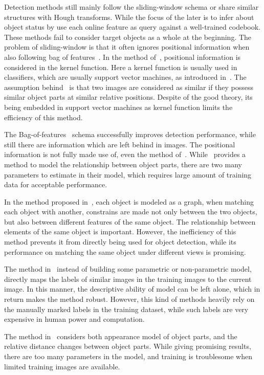 \documentclass[paper]{ieice}
\begin{document}
Detection methods still mainly follow the sliding-window schema or share similar structures with Hough transforms. While the focus of the later is to infer about object status by use each online feature as query against a well-trained codebook. These methods fail to consider target objects as a whole at the beginning. The problem of sliding-window is that it often ignores positional information when also following bag of features~\cite{bgf}. In the method of~\cite{spmk}, positional information is considered in the kernel function. Here a kernel function is usually used in classifiers, which are usually support vector machines, as introduced in~\cite{kmts}. The assumption behind~\cite{spmk} is that two images are considered as similar if they possess similar object parts at similar relative positions. Despite of the good theory, its being embedded in support vector machines as kernel function limits the efficiency of this method.


The Bag-of-features~\cite{bgf} schema successfully improves detection performance, while still there are information which are left behind in images. The positional information is not fully made use of, even the method of~\cite{kmts}. While~\cite{ac3} provides a method to model the relationship between object parts, there are two many parameters to estimate in their model, which requires large amount of training data for acceptable performance.

In the method proposed in~\cite{ac222}, each object is modeled as a graph, when matching each object with another, constrains are made not only between the two objects, but also between different features of the same object. The relationship between elements of the same object is important. However, the inefficiency of this method prevents it from directly being used for object detection, while its performance on matching the same object under different views is promising.

The method in~\cite{lbt1} instead of building some parametric or non-parametric model, directly maps the labels of similar images in the training images to the current image. In this manner, the descriptive ability of model can be left alone, which in return makes the method robust. However, this kind of methods heavily rely on the manually marked labels in the training dataset, while such labels are very expensive in human power and computation.

The method in~\cite{ac3} considers both appearance model of object parts, and the relative distance changes between object parts. While giving promising results, there are too many parameters in the model, and training is troublesome when limited training images are available.
\end{document}
